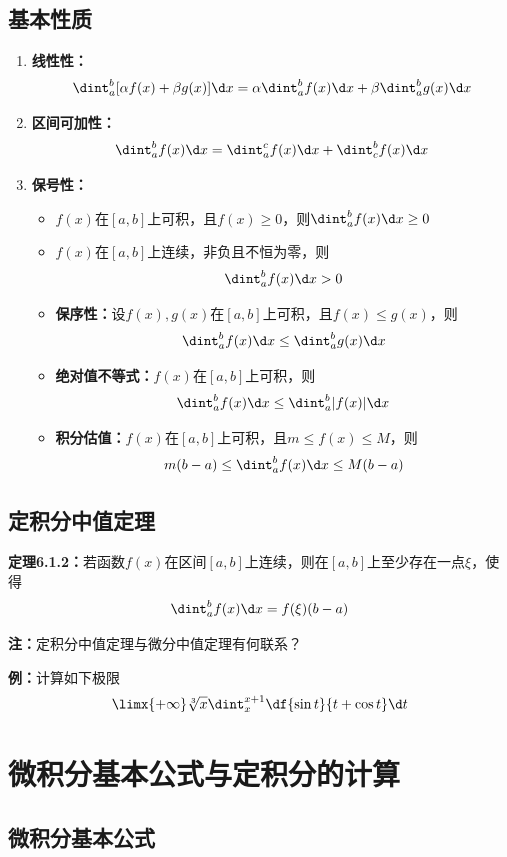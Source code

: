 \subsection{基本性质}

\begin{enumerate}[(1)]
  \setlength{\itemindent}{1cm}
  \item {\bf 线性性：}
  $$\dint_a^b[\alpha
  f(x)+\beta g(x)]\d x=\alpha\dint_a^bf(x)\d x+\beta\dint_a^bg(x)\d x$$
  \item {\bf 区间可加性：}
  $$\dint_a^bf(x)\d x=\dint_a^cf(x)\d x+\dint_c^bf(x)\d x$$
  \item {\bf 保号性：}
  \begin{itemize}
    \item $f(x)$在$[a,b]$上可积，且$f(x)\geq 0$，则$\dint_a^bf(x)\d x\geq 0$ 
    \item $f(x)$在$[a,b]$上连续，非负且不恒为零，则$$\dint_a^bf(x)\d x> 0$$ 
    \item {\bf 保序性：}设$f(x),g(x)$在$[a,b]$上可积，且$f(x)\leq g(x)$，则
    $$\dint_a^bf(x)\d x\leq \dint_a^bg(x)\d x$$
    \item {\bf 绝对值不等式：}$f(x)$在$[a,b]$上可积，则
    $$\dint_a^bf(x)\d x\leq\dint_a^b|f(x)|\d x$$ 
    \item {\bf 积分估值：}$f(x)$在$[a,b]$上可积，且$m\leq f(x)\leq M$，则
    $$m(b-a)\leq\dint_a^bf(x)\d x\leq M(b-a)$$
  \end{itemize}
\end{enumerate}

\subsection{定积分中值定理}

{\bf 定理6.1.2：}若函数$f(x)$在区间$[a,b]$上连续，则在$[a,b]$上至少存在一点$\xi$，使得
$$\dint_a^bf(x)\d x=f(\xi)(b-a)$$

{\bf 注：}定积分中值定理与微分中值定理有何联系？

{\bf 例：}计算如下极限
$$\limx{+\infty}\sqrt[3]x\dint_x^{x+1}\df{\sin t}{t+\cos t}\d t$$

\section{微积分基本公式与定积分的计算}

\subsection{微积分基本公式}

